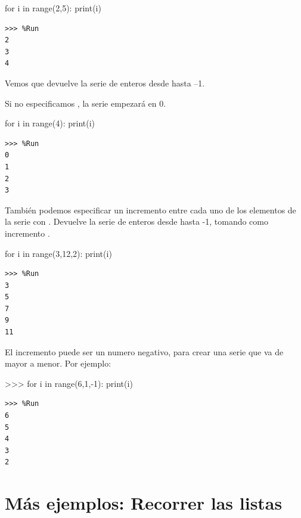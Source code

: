 \begin{python}[frame=single]
for i in range(2,5):
    print(i)
\end{python}

\begin{Verbatim}[frame=single]    
>>> %Run
2
3
4
\end{Verbatim}

Vemos que 
devuelve la serie de enteros desde  hasta –1.

Si no especificamos , la serie empezará en 0.

\begin{python}[frame=single]
for i in range(4):
    print(i)
\end{python}

\begin{Verbatim}[frame=single]
>>> %Run    
0
1
2
3
\end{Verbatim}

También podemos especificar un incremento entre cada uno de los elementos de la serie con
. Devuelve la serie de enteros desde  hasta -1, tomando como incremento .

\begin{python}[frame=single]
for i in range(3,12,2):
    print(i)
\end{python}   

\begin{Verbatim}[frame=single]
>>> %Run
3
5
7
9
11
\end{Verbatim}

El incremento puede ser un numero negativo, para crear una serie que va de mayor a menor. Por ejemplo:

\begin{python}[frame=single]
>>> for i in range(6,1,-1):
    print(i)
\end{python}   

\begin{Verbatim}[frame=single]
>>> %Run
6
5
4
3
2
\end{Verbatim}




\section{Más ejemplos: Recorrer las listas}
\label{filter}

